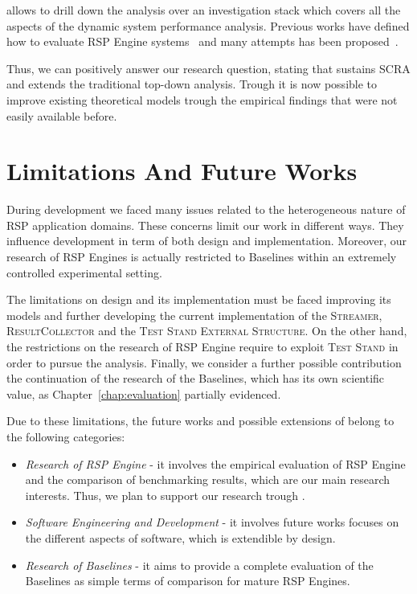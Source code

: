 \noindent \name allows to drill down the analysis over an investigation stack which covers all the aspects of the dynamic system performance analysis. Previous works have defined how to evaluate RSP Engine systems~\cite{DBLP:conf/esws/ScharrenbachUMVB13} and many attempts has been proposed~\cite{Zhang2012, LePhuoc2012c, DBLP:conf/semweb/DellAglioCBCV13}. 

Thus, we can positively answer our research question, stating that \name sustains SCRA and extends the traditional top-down analysis. Trough it is now possible to improve existing theoretical models trough the empirical findings that were not easily available before.

\section{Limitations And Future Works}\label{sec:research-fw-conclusion}

During \name development we faced many issues related to the heterogeneous nature of RSP application domains. These concerns limit our work in different ways. They influence \name development in term of both design and implementation. Moreover, our research of RSP Engines  is actually restricted to \name Baselines within an extremely controlled experimental setting.

The limitations on \name design and its implementation must be faced improving its models and further developing the current implementation of the \textsc{Streamer}, \textsc{ResultCollector} and the \textsc{Test Stand External Structure}. On the other hand, the restrictions on the research of RSP Engine require to exploit \name \textsc{Test Stand} in order to pursue the analysis. Finally, we consider a further possible contribution the continuation of the research of the Baselines, which has its own scientific value, as Chapter~\ref{chap:evaluation} partially evidenced.

Due to these limitations, the future works and possible extensions of \name belong to the following categories:
\begin{itemize}
\item \textit{Research of RSP Engine} - it involves the empirical evaluation of RSP Engine and the comparison of benchmarking results, which are our main research interests. Thus, we plan to support our research trough \namens.
\item \textit{Software Engineering and Development} - it involves future works focuses on the different aspects of \name software, which is extendible by design.
\item \textit{Research of Baselines} - it aims to provide a complete evaluation of the Baselines as simple terms of comparison for mature RSP Engines.
\end{itemize}

